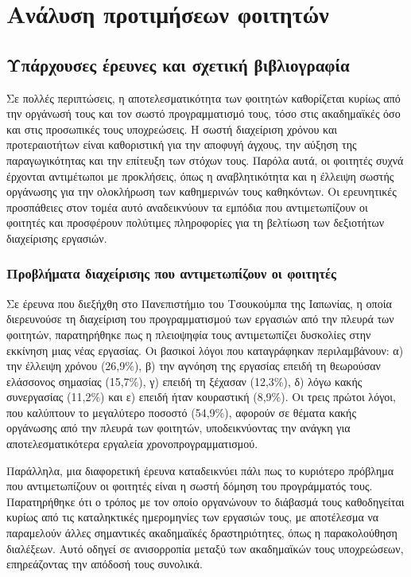 \chapter{Ανάλυση προτιμήσεων φοιτητών}
    \section{Υπάρχουσες έρευνες και σχετική βιβλιογραφία}
        Σε πολλές περιπτώσεις, η αποτελεσματικότητα των φοιτητών καθορίζεται κυρίως από την οργάνωσή τους και τον σωστό προγραμματισμό τους, τόσο στις ακαδημαϊκές όσο και στις προσωπικές τους υποχρεώσεις. Η σωστή διαχείριση χρόνου και προτεραιοτήτων είναι καθοριστική για την αποφυγή άγχους, την αύξηση της παραγωγικότητας και την επίτευξη των στόχων τους. Παρόλα αυτά, οι φοιτητές συχνά έρχονται αντιμέτωποι με προκλήσεις, όπως η αναβλητικότητα και η έλλειψη σωστής οργάνωσης για την ολοκλήρωση των καθημερινών τους καθηκόντων. Οι ερευνητικές προσπάθειες στον τομέα αυτό αναδεικνύουν τα εμπόδια που αντιμετωπίζουν οι φοιτητές και προσφέρουν πολύτιμες πληροφορίες για τη βελτίωση των δεξιοτήτων διαχείρισης εργασιών.

        \subsection{Προβλήματα διαχείρισης που αντιμετωπίζουν οι φοιτητές} \label{sec:student_problems}
            Σε έρευνα \cite{Fukuzawa2015} που διεξήχθη στο Πανεπιστήμιο του Τσουκούμπα της Ιαπωνίας, η οποία διερευνούσε τη διαχείριση του προγραμματισμού των εργασιών από την πλευρά των φοιτητών, παρατηρήθηκε πως η πλειοψηφία τους αντιμετωπίζει δυσκολίες στην εκκίνηση μιας νέας εργασίας. Οι βασικοί λόγοι που καταγράφηκαν περιλαμβάνουν: α) την έλλειψη χρόνου (26,9\%), β) την αγνόηση της εργασίας επειδή τη θεωρούσαν ελάσσονος σημασίας (15,7\%), γ) επειδή τη ξέχασαν (12,3\%), δ) λόγω κακής συνεργασίας (11,2\%) και ε) επειδή ήταν κουραστική (8,9\%). Οι τρεις πρώτοι λόγοι, που καλύπτουν το μεγαλύτερο ποσοστό (54,9\%), αφορούν σε θέματα κακής οργάνωσης από την πλευρά των φοιτητών, υποδεικνύοντας την ανάγκη για αποτελεσματικότερα εργαλεία χρονοπρογραμματισμού.

            Παράλληλα, μια διαφορετική έρευνα \cite{Trujillo2020} καταδεικνύει πάλι πως το κυριότερο πρόβλημα που αντιμετωπίζουν οι φοιτητές είναι η σωστή δόμηση του προγράμματός τους. Παρατηρήθηκε ότι ο τρόπος με τον οποίο οργανώνουν το διάβασμά τους καθοδηγείται κυρίως από τις καταληκτικές ημερομηνίες των εργασιών τους, με αποτέλεσμα να παραμελούν άλλες σημαντικές ακαδημαϊκές δραστηριότητες, όπως η παρακολούθηση διαλέξεων. Αυτό οδηγεί σε ανισορροπία μεταξύ των ακαδημαϊκών τους υποχρεώσεων, επηρεάζοντας την απόδοσή τους συνολικά.

